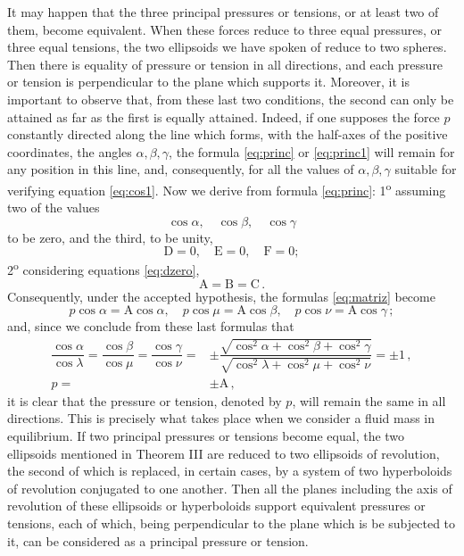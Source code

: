 \documentclass[leqno,openright,smallroyalvopaper,8pt,twoside,showtrims]{memoir}
\begin{document}
It may happen that the three principal pressures or tensions, or at least two of them, become equivalent. When these forces reduce to three equal pressures, or three equal tensions, the two ellipsoids we have spoken of reduce to two spheres. Then there is equality of pressure or tension in all directions, and each pressure or tension is perpendicular to the plane which supports it. Moreover, it is important to observe that, from these last two conditions, the second can only be attained as far as the first is equally attained. Indeed, if one supposes the force $p$ constantly directed along the line which forms, with the half-axes of the positive coordinates, the angles $\alpha,\beta,\gamma$, the formula \eqref{eq:princ} or \eqref{eq:princ1} will remain for any position in this line, and, consequently, for all the values of $\alpha,\beta,\gamma$ suitable for verifying equation \eqref{eq:cos1}. Now we derive from formula \eqref{eq:princ}: 1\textsuperscript{o} assuming two of the values
\begin{equation*}
\cos\alpha,\quad \cos\beta,\quad \cos\gamma
\end{equation*}
to be zero, and the third, to be unity, 
\begin{equation}\label{eq:dzero}
\text{D}=0,\quad \text{E}=0,\quad \text{F}=0;
\end{equation}
2\textsuperscript{o} considering equations \eqref{eq:dzero},
\begin{equation}
\text{A}=\text{B}=\text{C}\,.
\end{equation}
Consequently, under the accepted hypothesis, the formulas \eqref{eq:matriz} become
\begin{equation}
p\cos\alpha=\text{A}\cos\alpha,\quad p\cos\mu=\text{A}\cos\beta,\quad p\cos\nu=\text{A}\cos\gamma\,;
\end{equation}
and, since we conclude from these last formulas that
\begin{align}
\dfrac{\cos\alpha}{\cos\lambda}=\dfrac{\cos\beta}{\cos\mu}=\dfrac{\cos\gamma}{\cos\nu}=&\pm\dfrac{\sqrt{\cos^2\alpha+\cos^2\beta+\cos^2\gamma}}{\sqrt{\cos^2\lambda+\cos^2\mu+\cos^2\nu}}=\pm 1\,,\\
p=&\pm \text{A}\,,
\end{align}
it is clear that the pressure or tension, denoted by $p$, will remain the same in all directions. This is precisely what takes place when we consider a fluid mass in equilibrium. If two principal pressures or tensions become equal, the two ellipsoids mentioned in Theorem III are reduced to two ellipsoids of revolution, the second of which is replaced, in certain cases, by a system of two hyperboloids of revolution conjugated to one another. Then all the planes including the axis of revolution of these ellipsoids or hyperboloids support equivalent pressures or tensions, each of which, being perpendicular to the plane which is be subjected to it, can be considered as a principal pressure or tension.
\end{document}
